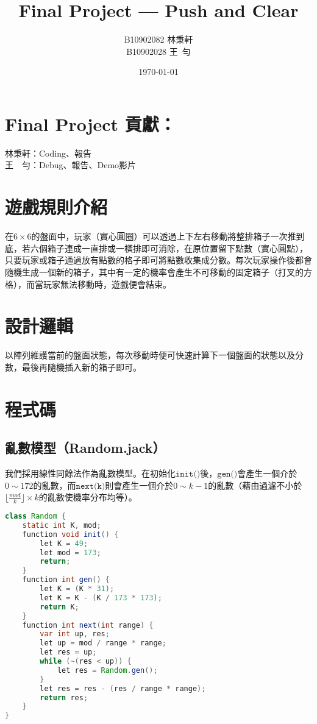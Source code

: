 \documentclass[pstricks, 12pt, a4paper]{article}
\title{Final Project --- Push and Clear}
\author{B10902082 林秉軒\\B10902028 王\ 勻}
\date{\today}
\begin{document}
\maketitle

\thispagestyle{std}


\section{Final Project 貢獻：}
\noindent 林秉軒：Coding、報告\\
王　勻：Debug、報告、Demo影片

\section{遊戲規則介紹}
在$6\times 6$的盤面中，玩家（實心圓圈）可以透過上下左右移動將整排箱子一次推到底，若六個箱子連成一直排或一橫排即可消除，在原位置留下點數（實心圓點），只要玩家或箱子通過放有點數的格子即可將點數收集成分數。每次玩家操作後都會隨機生成一個新的箱子，其中有一定的機率會產生不可移動的固定箱子（打叉的方格），而當玩家無法移動時，遊戲便會結束。

\section{設計邏輯}
以陣列維護當前的盤面狀態，每次移動時便可快速計算下一個盤面的狀態以及分數，最後再隨機插入新的箱子即可。

\section{程式碼}
  \subsection{亂數模型（Random.jack）}
    我們採用線性同餘法作為亂數模型。在初始化$\texttt{init()}$後，$\texttt{gen()}$會產生一個介於$0\sim 172$的亂數，而$\texttt{next(k)}$則會產生一個介於$0\sim k-1$的亂數（藉由過濾不小於$\lfloor \frac{mod}{k}\rfloor\times k$的亂數使機率分布均等）。
    \begin{lstlisting}[language=Java, frame=single]
class Random {
    static int K, mod;
    function void init() {
        let K = 49;
        let mod = 173;
        return;
    }
    function int gen() {
        let K = (K * 31);
        let K = K - (K / 173 * 173);
        return K;
    }
    function int next(int range) {
        var int up, res;
        let up = mod / range * range;
        let res = up;
        while (~(res < up)) {
            let res = Random.gen();
        }
        let res = res - (res / range * range);
        return res;
    }
}
    \end{lstlisting}
\end{document}
